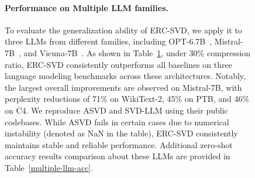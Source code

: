 \begin{figure}[h]
    \centering
    \begin{minipage}[t]{0.49\textwidth}
        \vspace{0pt}
        \normalsize
        \paragraph{Performance on Multiple LLM families.}
        To evaluate the generalization ability of ERC-SVD, we apply it to three LLMs from different families, including OPT-6.7B~\cite{zhang2022opt}, Mistral-7B~\cite{jiang2023mistral}, and Vicuna-7B~\cite{chiang2023vicuna}. 
        As shown in Table~\ref{different_llm_families}, under 30\% compression ratio, ERC-SVD consistently outperforms all baselines on three language modeling benchmarks across these architectures. 
        Notably, the largest overall improvements are observed on Mistral-7B, with perplexity reductions of 71\% on WikiText-2, 45\% on PTB, and 46\% on C4. 
        We reproduce ASVD and SVD-LLM using their public codebases. While ASVD fails in certain cases due to numerical instability (denoted as NaN in the table), ERC-SVD consistently maintains stable and reliable performance. Additional zero-shot accuracy results comparison about these LLMs are provided in Table~\ref{multiple-llm-acc}.
    \end{minipage}%
    \hfill
    \begin{minipage}[t]{0.455\textwidth}
        \vspace{0pt}
        \centering
        \vspace{-8pt}
        \label{different_llm_families}
        \small
\end{minipage}
\end{figure}
